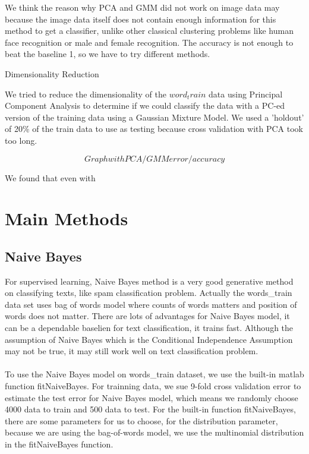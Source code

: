 \documentclass[]{article}
\begin{document}
We think the reason why PCA and GMM did not work on image data may because the image data itself does not contain enough information for this method to get a classifier, unlike other classical clustering problems like human face recognition or male and female recognition. The accuracy is not enough to beat the baseline 1, so we have to try different methods.

Dimensionality Reduction

We tried to reduce the dimensionality of the $word_train$ data using Principal Component Analysis to determine if we could classify the data with a PC-ed version of the training data using a Gaussian Mixture Model. We used a 'holdout' of 20\% of the train data to use as testing because cross validation with PCA took too long.  

$$Graph with PCA/GMM error/accuracy$$

We found that even with 


\section{Main Methods}

\subsection{Naive Bayes}

For supervised learning, Naive Bayes method is a very good generative method on classifying texts, like spam classification problem. Actually the words\_train data set uses bag of words model where counts of words matters and position of words does not matter. There are lots of advantages for Naive Bayes model, it can be a dependable baselien for text classification, it trains fast. Although the assumption of Naive Bayes which is the Conditional Independence Assumption may not be true, it may still work well on text classification problem.\\\\

To use the Naive Bayes model on words\_train dataset, we use the built-in matlab function fitNaiveBayes. For trainning data, we sue 9-fold cross validation error to estimate the test error for Naive Bayes model, which means we randomly choose 4000 data to train and 500 data to test. For the built-in function fitNaiveBayes, there are some parameters for us to choose, for the distribution parameter, because we are using the bag-of-words model, we use the multinomial distribution in the fitNaiveBayes function. \\\\
\end{document}
